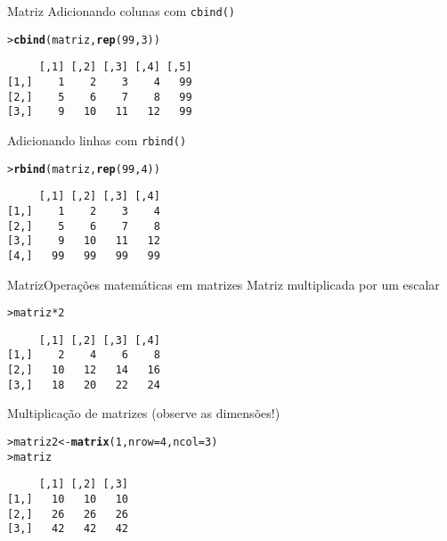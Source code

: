\documentclass[10pt,handout]{beamer}\usepackage{graphicx, color}
\makeatletter
\newcommand{\hlfunctioncall}[1]{\textcolor[rgb]{0,0,0.545098039215686}{\textbf{#1}}}%
\newenvironment{kframe}{%
 \def\at@end@of@kframe{}%
 \ifinner\ifhmode%
  \def\at@end@of@kframe{\end{minipage}}%
  \begin{minipage}{\columnwidth}%
 \fi\fi%
 \def\FrameCommand##1{\hskip\@totalleftmargin \hskip-\fboxsep
 \colorbox{shadecolor}{##1}\hskip-\fboxsep
     \hskip-\linewidth \hskip-\@totalleftmargin \hskip\columnwidth}%
 \MakeFramed {\advance\hsize-\width
   \@totalleftmargin\z@ \linewidth\hsize
   \@setminipage}}%
 {\par\unskip\endMakeFramed%
 \at@end@of@kframe}
\newenvironment{knitrout}{}{} %
\makeatother
\begin{document}
\begin{frame}[fragile=singleslide]{Matriz}
Adicionando colunas com \verb|cbind()|
\begin{knitrout}\small
{}\color{fgcolor}\begin{kframe}
\begin{alltt}
> \hlfunctioncall{cbind}(matriz, \hlfunctioncall{rep}(99, 3))
\end{alltt}
\begin{verbatim}
     [,1] [,2] [,3] [,4] [,5]
[1,]    1    2    3    4   99
[2,]    5    6    7    8   99
[3,]    9   10   11   12   99
\end{verbatim}
\end{kframe}
\end{knitrout}

Adicionando linhas com \verb|rbind()|
\begin{knitrout}\small
{}\color{fgcolor}\begin{kframe}
\begin{alltt}
> \hlfunctioncall{rbind}(matriz, \hlfunctioncall{rep}(99, 4))
\end{alltt}
\begin{verbatim}
     [,1] [,2] [,3] [,4]
[1,]    1    2    3    4
[2,]    5    6    7    8
[3,]    9   10   11   12
[4,]   99   99   99   99
\end{verbatim}
\end{kframe}
\end{knitrout}

\end{frame}

\begin{frame}[fragile=singleslide]{Matriz}{Operações matemáticas em
    matrizes}
Matriz multiplicada por um escalar
\begin{knitrout}\small
{}\color{fgcolor}\begin{kframe}
\begin{alltt}
> matriz * 2
\end{alltt}
\begin{verbatim}
     [,1] [,2] [,3] [,4]
[1,]    2    4    6    8
[2,]   10   12   14   16
[3,]   18   20   22   24
\end{verbatim}
\end{kframe}
\end{knitrout}

Multiplicação de matrizes (observe as dimensões!)
\begin{knitrout}\small
{}\color{fgcolor}\begin{kframe}
\begin{alltt}
> matriz2 <- \hlfunctioncall{matrix}(1, nrow=4, ncol=3)
> matriz %*% matriz2
\end{alltt}
\begin{verbatim}
     [,1] [,2] [,3]
[1,]   10   10   10
[2,]   26   26   26
[3,]   42   42   42
\end{verbatim}
\end{kframe}
\end{knitrout}

\end{frame}
\end{document}
